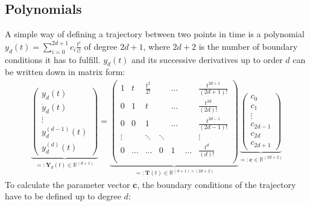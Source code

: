 \documentclass[a4paper,11pt,headings=standardclasses,parskip=half]{scrartcl}
\newcommand{\R}{\mathbb{R}} %
\begin{document}
\subsection{Polynomials} \label{sec:polynomials}
A simple way of defining a trajectory between two points in time is a polynomial $y_d(t)=\sum_{i=0}^{2d+1}c_i\frac{t^i}{i!}$ of degree $2d+1$, where $2d+2$ is the number of boundary conditions it has to fulfill. $y_d(t)$ and its successive derivatives up to order $d$ can be written down in matrix form:
\begin{align}
\label{eq:1}
\underbrace{\begin{pmatrix}
y_d(t) \\ \dot{y}_d(t) \\ \vdots \\ y_d^{(d-1)}(t) \\ y_d^{(d)}(t)
\end{pmatrix}}_{=:\mathbf{Y}_d(t) \in \R^{(d+1)}}
=\underbrace{\begin{pmatrix}
1 &t & \frac{t^2}{2!}&         &  \hdots         &  & \frac{t^{2d+1}}{(2d+1)!} \\
0 &1   & t             &         &  \hdots         &  & \frac{t^{2d}}{(2d)!} \\
0 &0   & 1               &         & \hdots          &  &  \frac{t^{2d-1}}{(2d-1)!} \\
\vdots &                 &  \ddots & \ddots &  &   &  \vdots \\
0      &\hdots           & \hdots       & 0 & 1& \hdots & \frac{t^{d}}{(d)!} \\
\end{pmatrix}}_{=:\mathbf{T}(t)\in \R^{(d+1)\times (2d+2)}}
\underbrace{
\begin{pmatrix}
c_0 \\ c_1 \\ \vdots \\ c_{2d-1}\\ c_{2d}\\ c_{2d+1} 
\end{pmatrix}}_{=:\mathbf{c}\in \R^{(2d+2)}}
\end{align}
To calculate the parameter vector $\mathbf{c}$, the boundary conditions of the trajectory have to be defined up to degree $d$:
\end{document}

